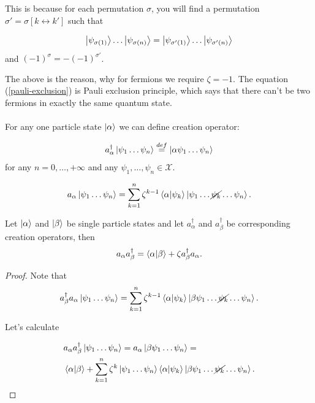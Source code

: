\documentclass[main.tex]{subfiles}
\begin{document}
This is because for each permutation $\sigma$, you will find a permutation 
$\sigma' = \sigma [k\leftrightarrow k']$ such that

\begin{equation}
\ket{\psi_{\sigma(1)}} \dots \ket{\psi_{\sigma(n)}} = \ket{\psi_{\sigma'(1)}} \dots  \ket{\psi_{\sigma'(n)}}
\end{equation}
and $(-1)^\sigma = -(-1)^{\sigma'}$.

The above is the reason, why for fermions we require $\zeta = -1$. The equation (\ref{pauli-exclusion}) is Pauli exclusion principle, which says that there can't be two fermions in exactly the same quantum state.

\paragraph{}
For any one particle state $\ket{\alpha}$ we can define creation operator:
\begin{definition}
\begin{equation}
a^\dagger_\alpha \ket{\psi_1\dots\psi_n} \stackrel{def}{=} \ket{\alpha \psi_1\dots\psi_n}
\end{equation}
for any $n=0, \dots, +\infty$ and any $\psi_1, \dots, \psi_n\in \mathcal{X}$.
\end{definition}

\begin{proposition}
\begin{equation}
a_\alpha \ket{\psi_1\dots\psi_n} = \sum_{k=1}^n \zeta^{k - 1} \bra{\alpha}\ket{\psi_k}\ket{\psi_1\dots\cancel{\psi_k}\dots\psi_n}.
\end{equation}
\end{proposition}
\begin{proposition}
Let $\ket{\alpha}$ and $\ket{\beta}$ be single particle states and let $a^\dagger_{\alpha}$ and $a^\dagger_{\beta}$ be corresponding creation operators, then
\begin{equation}
a_\alpha a^\dagger_\beta = \bra{\alpha}\ket{\beta} + \zeta a^\dagger_\beta a_\alpha.
\end{equation}
\end{proposition}
\begin{proof}
Note that
\begin{equation}
a^\dagger_\beta a_\alpha \ket{\psi_1\dots\psi_n} = \sum_{k=1}^n \zeta^{k - 1} \bra{\alpha}\ket{\psi_k}\ket{\beta \psi_1\dots\cancel{\psi_k}\dots\psi_n}.
\end{equation}

Let's calculate

\begin{align*}
& a_\alpha a^\dagger_\beta \ket{\psi_1\dots\psi_n} = a_\alpha \ket{\beta \psi_1\dots\psi_n} = \\
& \bra{\alpha}\ket{\beta} 
+ \sum_{k=1}^n \zeta^k \ket{\psi_1\dots\psi_n} \bra{\alpha}\ket{\psi_k}\ket{\beta \psi_1\dots\cancel{\psi_k}\dots\psi_n}.
\end{align*}
\end{proof}
\end{document}
